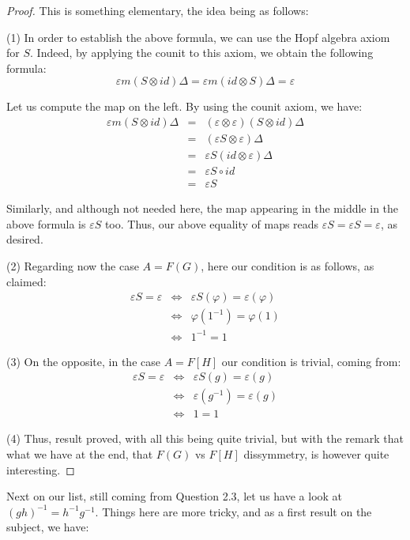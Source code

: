 \documentclass[12pt]{amsbook}
\begin{document}
\begin{proof}
This is something elementary, the idea being as follows:

\medskip

(1) In order to establish the above formula, we can use the Hopf algebra axiom for $S$. Indeed, by applying the counit to this axiom, we obtain the following formula:
$$\varepsilon m(S\otimes id)\Delta=\varepsilon m(id\otimes S)\Delta=\varepsilon$$

Let us compute the map on the left. By using the counit axiom, we have:
\begin{eqnarray*}
\varepsilon m(S\otimes id)\Delta
&=&(\varepsilon\otimes\varepsilon)(S\otimes id)\Delta\\
&=&(\varepsilon S\otimes\varepsilon)\Delta\\
&=&\varepsilon S(id\otimes\varepsilon)\Delta\\
&=&\varepsilon S\circ id\\
&=&\varepsilon S
\end{eqnarray*}

Similarly, and although not needed here, the map appearing in the middle in the above formula is $\varepsilon S$ too. Thus, our above equality of maps reads $\varepsilon S=\varepsilon S=\varepsilon$, as desired.

\medskip

(2) Regarding now the case $A=F(G)$, here our condition is as follows, as claimed:
\begin{eqnarray*}
\varepsilon S=\varepsilon
&\iff&\varepsilon S(\varphi)=\varepsilon(\varphi)\\
&\iff&\varphi(1^{-1})=\varphi(1)\\
&\iff&1^{-1}=1
\end{eqnarray*}

(3) On the opposite, in the case $A=F[H]$ our condition is trivial, coming from:
\begin{eqnarray*}
\varepsilon S=\varepsilon
&\iff&\varepsilon S(g)=\varepsilon(g)\\
&\iff&\varepsilon(g^{-1})=\varepsilon(g)\\
&\iff&1=1
\end{eqnarray*}

(4) Thus, result proved, with all this being quite trivial, but with the remark that what we have at the end, that $F(G)$ vs $F[H]$ dissymmetry, is however quite interesting.
\end{proof}

Next on our list, still coming from Question 2.3, let us have a look at $(gh)^{-1}=h^{-1}g^{-1}$. Things here are more tricky, and as a first result on the subject, we have:
\end{document}
